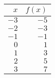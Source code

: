 \begin{tabular}{rr} \toprule
$x$  & $f(x)$ \\\midrule
$-3$ & $-5$   \\[6pt]
$-2$ & $-3$   \\[6pt]
$-1$ & $-1$   \\[6pt]
$0$  & $1$    \\[6pt]
$1$  & $3$    \\[6pt]
$2$  & $5$    \\[6pt]
$3$  & $7$    \\\bottomrule
\end{tabular}
